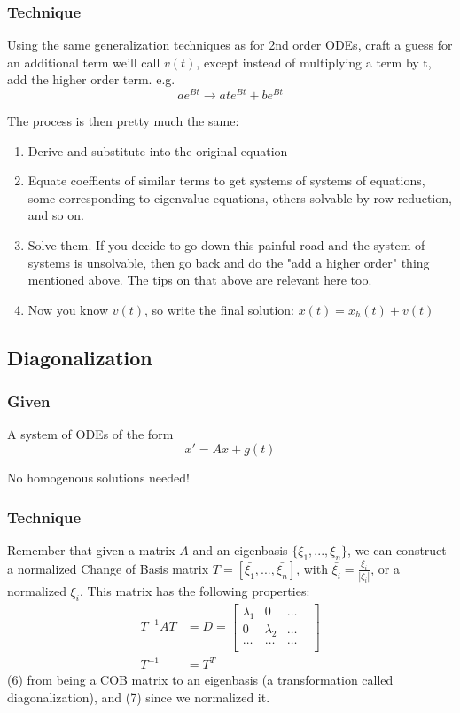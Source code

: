 \documentclass[11pt]{article}
\begin{document}
\subsubsection{Technique}
Using the same generalization techniques as for 2nd order ODEs, craft a guess for an additional
term we'll call $v(t)$, except instead of multiplying a term by t, add the higher order term. e.g.
\[ ae^{Bt} \rightarrow ate^{Bt} + be^{Bt} \]

The process is then pretty much the same:
\begin{enumerate}
    \item Derive and substitute into the original equation
    \item Equate coeffients of similar terms to get systems of systems of equations, 
          some corresponding to eigenvalue equations, others solvable by row reduction, 
          and so on. 
    \item Solve them. If you decide to go down this painful road and the system of systems is
          unsolvable, then go back and do the "add a higher order" thing mentioned above. The
          tips on that above are relevant here too.
    \item Now you know $v(t)$, so write the final solution: $x(t) = x_h(t) + v(t)$
\end{enumerate}
\subsection{Diagonalization}
\subsubsection{Given}
A system of ODEs of the form
\[ x' = Ax + g(t) \]

No homogenous solutions needed!

\subsubsection{Technique}
Remember that given a matrix $A$ and an eigenbasis $\{\xi_1, ..., \xi_n\}$, we can construct a
normalized Change of Basis matrix $T = \left[ \bar{\xi_1}, ..., \bar{\xi_n} \right]$, with 
$\bar{\xi_i} = \frac{\xi_i}{|\xi_i|}$, or a normalized $\xi_i$. This matrix has the following 
properties:
\begin{align}
    T^{-1}AT &= D = \begin{bmatrix} 
                        \lambda_1 & 0 & \dots & \\
                        0 & \lambda_2 & \dots \\
                        \dots & \dots & \dots \\
                    \end{bmatrix} \\
                    T^{-1} &= T^T
\end{align}
(6) from being a COB matrix to an eigenbasis (a transformation called diagonalization), and (7) since
we normalized it. 
\end{document}

